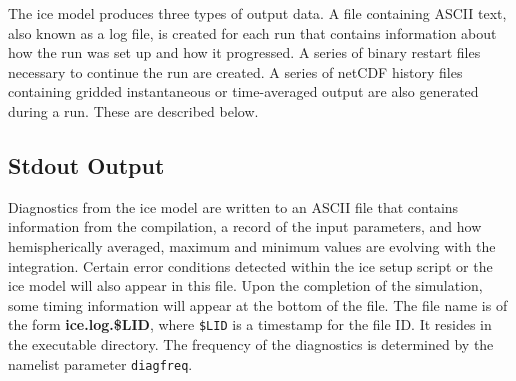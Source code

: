 
The ice model produces three types of output data.  A file containing
ASCII text, also known as a log file, is created for each run that
contains information about how the run was set up and how it progressed.
A series of binary restart files necessary to continue the run are created.
A series of netCDF history files containing gridded instantaneous or
time-averaged output are also generated during a run.  These are described below. 


\subsection{Stdout Output}
\label{stdout}

Diagnostics from the ice model are written to an ASCII file that contains
information from the compilation, a record
of the input parameters, and how hemispherically averaged, maximum and minimum
values are evolving with the integration.  Certain error conditions detected
within the ice setup script or the ice model will also appear in this file.
Upon the completion of the simulation, some timing information will appear
at the bottom of the file.
The file name is of the form {\bf ice.log.\$LID}, where \texttt{\$LID} is
a timestamp for the file ID. It resides in the executable directory.
The frequency of the diagnostics is determined by the namelist parameter
\texttt{diagfreq}.

